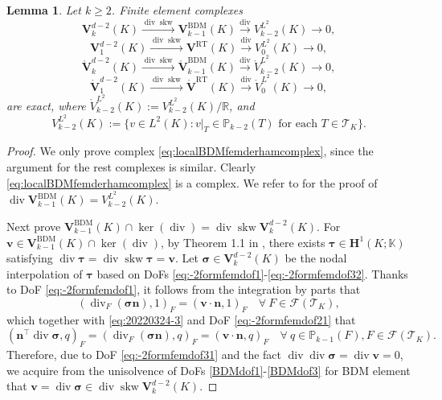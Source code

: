 \documentclass[10pt]{amsart}
\newtheorem{lemma}[theorem]{Lemma}
\renewcommand{\div}{\operatorname{div}}
\newcommand{\skw}{\operatorname{skw}}
\numberwithin{equation}{section}
\begin{document}
\begin{lemma}
Let $k\geq2$. Finite element complexes
\begin{equation}\label{eq:localBDMfemderhamcomplex}
\boldsymbol{V}_{k}^{d-2}(K)\xrightarrow{\div\skw}\boldsymbol{V}_{k-1}^{\mathrm{BDM}}(K)\xrightarrow{\div} V_{k-2}^{L^2}(K)\to0,    
\end{equation}
\begin{equation}\label{eq:localRTfemderhamcomplex}
\boldsymbol{V}_{1}^{d-2}(K)\xrightarrow{\div\skw}\boldsymbol{V}^{\mathrm{RT}}(K)\xrightarrow{\div} V_{0}^{L^2}(K)\to0,    
\end{equation}
\begin{equation}\label{eq:localBDMfemderhamcomplex0}
\mathring{\boldsymbol{V}}_{k}^{d-2}(K)\xrightarrow{\div\skw}\mathring{\boldsymbol{V}}_{k-1}^{\mathrm{BDM}}(K)\xrightarrow{\div} \mathring{V}_{k-2}^{L^2}(K)\to0,    
\end{equation}
\begin{equation}\label{eq:localRTfemderhamcomplex0}
\mathring{\boldsymbol{V}}_{1}^{d-2}(K)\xrightarrow{\div\skw}\mathring{\boldsymbol{V}}^{\mathrm{RT}}(K)\xrightarrow{\div} \mathring{V}_{0}^{L^2}(K)\to0,    
\end{equation}
are exact, where $\mathring{V}_{k-2}^{L^2}(K):=V_{k-2}^{L^2}(K)/\mathbb R$, and
\[
V_{k-2}^{L^2}(K):=\{v\in L^2(K): v|_{T}\in \mathbb P_{k-2}(T) \textrm{ for each } T\in\mathcal T_K\}.
\]
\end{lemma}
\begin{proof}
We only prove complex \eqref{eq:localBDMfemderhamcomplex}, since the argument for the rest complexes is similar. Clearly \eqref{eq:localBDMfemderhamcomplex} is a complex. We refer to \cite[Section 4]{ChenHuang2021divX} for the proof of $\div\boldsymbol{V}_{k-1}^{\mathrm{BDM}}(K)=V_{k-2}^{L^2}(K)$.

Next prove $\boldsymbol{V}_{k-1}^{\mathrm{BDM}}(K)\cap\ker(\div)=\div\skw\boldsymbol{V}_{k}^{d-2}(K)$. For $\boldsymbol{v}\in\boldsymbol{V}_{k-1}^{\mathrm{BDM}}(K)\cap\ker(\div)$, by Theorem 1.1 in \cite{CostabelMcIntosh2010}, there exists $\boldsymbol{\tau}\in\boldsymbol{H}^1(K;\mathbb K)$ satisfying $\div\boldsymbol{\tau}=\div\skw\boldsymbol{\tau}=\boldsymbol{v}$. Let $\boldsymbol{\sigma}\in \boldsymbol{V}_{k}^{d-2}(K)$ be the nodal interpolation of $\boldsymbol{\tau}$ based on DoFs \eqref{eq:-2formfemdof1}-\eqref{eq:-2formfemdof32}. Thanks to DoF \eqref{eq:-2formfemdof1}, it follows from the integration by parts that
\[
(\div_F(\boldsymbol{\sigma}\boldsymbol{n}), 1)_F=(\boldsymbol{v}\cdot\boldsymbol{n}, 1)_F\quad\forall~F\in\mathcal F(\mathcal T_K),
\]
which together with \eqref{eq:20220324-3} and DoF \eqref{eq:-2formfemdof21} that
\[
(\boldsymbol{n}^{\intercal}\div\boldsymbol{\sigma}, q)_F = (\div_F(\boldsymbol{\sigma}\boldsymbol{n}), q)_F=(\boldsymbol{v}\cdot\boldsymbol{n}, q)_F\quad\forall~q\in \mathbb P_{k-1}(F),F\in\mathcal F(\mathcal T_K).
\]
Therefore, due to DoF \eqref{eq:-2formfemdof31} and the fact $\div\div\boldsymbol{\sigma}=\div\boldsymbol{v}=0$,
we acquire from the unisolvence of DoFs \eqref{BDMdof1}-\eqref{BDMdof3} for BDM element that $\boldsymbol{v}=\div\boldsymbol{\sigma} \in \div\skw\boldsymbol{V}_{k}^{d-2}(K)$.
\end{proof}
\end{document}
